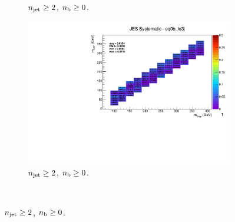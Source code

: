 \begin{figure}[ht!]
\begin{subfigure}[b]{0.32\textwidth}
    \caption{$n_{\text{jet}} \geq 2$, $n_{\text{b}} \geq 0$.}
  \end{subfigure}
  \begin{subfigure}[b]{0.32\textwidth}
    \includegraphics[width=\textwidth, page=1]{Figs/sms/t2degen/v19_3/systs/T2_4body_JES_eq0b_le3j.pdf}
    \caption{$n_{\text{jet}} \geq 2$, $n_{\text{b}} \geq 0$.}
    \label{fig:sms-jes-tdegen-ge2j-ge0b}
  \end{subfigure}\\ %

\end{figure}
